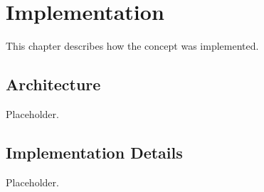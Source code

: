 
\chapter{Implementation}\label{ch:implementation}

This chapter describes how the concept was implemented.

\section{Architecture}\label{sec:architecture}

Placeholder.

\section{Implementation Details}\label{sec:implementation-details}

Placeholder.
